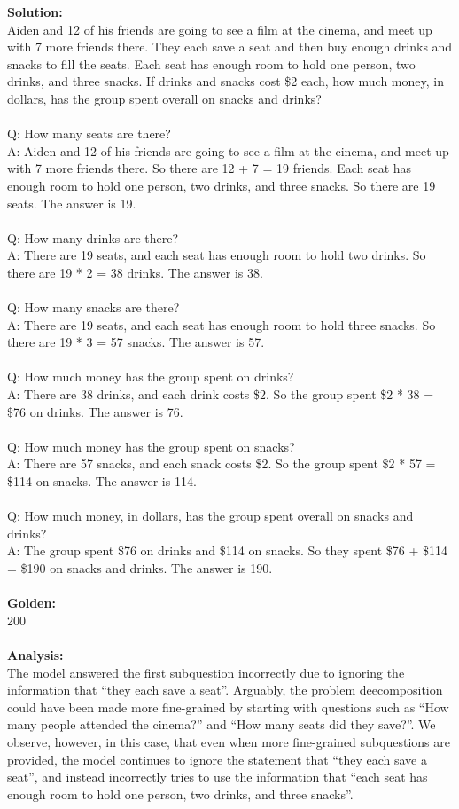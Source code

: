 \textbf{Solution:} \\
Aiden and 12 of his friends are going to see a film at the cinema, and meet up with 7 more friends there. They each save a seat and then buy enough drinks and snacks to fill the seats. Each seat has enough room to hold one person, two drinks, and three snacks. If drinks and snacks cost \$2 each, how much money, in dollars, has the group spent overall on snacks and drinks? \\
 \\
Q: How many seats are there? \\
A: Aiden and 12 of his friends are going to see a film at the cinema, and meet up with 7 more friends there. So there are 12 + 7 = 19 friends. Each seat has enough room to hold one person, two drinks, and three snacks. So there are 19 seats. The answer is 19. \\
 \\
Q: How many drinks are there? \\
A: There are 19 seats, and each seat has enough room to hold two drinks. So there are 19 * 2 = 38 drinks. The answer is 38. \\
 \\
Q: How many snacks are there? \\
A: There are 19 seats, and each seat has enough room to hold three snacks. So there are 19 * 3 = 57 snacks. The answer is 57. \\
 \\
Q: How much money has the group spent on drinks? \\
A: There are 38 drinks, and each drink costs \$2. So the group spent \$2 * 38 = \$76 on drinks. The answer is 76. \\
 \\
Q: How much money has the group spent on snacks? \\
A: There are 57 snacks, and each snack costs \$2. So the group spent \$2 * 57 = \$114 on snacks. The answer is 114. \\
 \\
Q: How much money, in dollars, has the group spent overall on snacks and drinks? \\
A: The group spent \$76 on drinks and \$114 on snacks. So they spent \$76 + \$114 = \$190 on snacks and drinks. The answer is 190. \\
 \\
\textbf{Golden:} \\
200 \\
 \\
\textbf{Analysis:} \\
The model answered the first subquestion incorrectly due to ignoring the information that ``they each save a seat''. Arguably, the problem deecomposition could have been made more fine-grained by starting with questions such as ``How many people attended the cinema?'' and ``How many seats did they save?''. We observe, however, in this case, that even when more fine-grained subquestions are provided, the model continues to ignore the statement that ``they each save a seat'', and instead incorrectly tries to use the information that ``each seat has enough room to hold one person, two drinks, and three snacks''.


